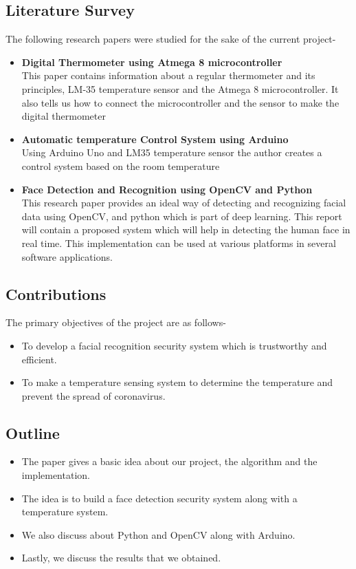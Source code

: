 \documentclass[conference]{IEEEtran}
\begin{document}
	\subsection{Literature Survey}
	The following research papers were studied for the sake of the current project-
	\begin{itemize}
		\item\textbf{Digital Thermometer using Atmega 8
			microcontroller}\cite{a} \\This paper contains information about a
		regular thermometer and its principles,
		LM-35 temperature sensor and the Atmega
		8 microcontroller. It also tells us how to
		connect the microcontroller and the sensor
		to make the digital thermometer
		\item \textbf{Automatic temperature Control System using
			Arduino}\cite{b} \\Using Arduino Uno and LM35
		temperature sensor the author creates a
		control system based on the room
		temperature
		\item \textbf{Face Detection and Recognition using OpenCV
			and Python}\cite{d} \\This research paper provides an ideal way of
		detecting and recognizing facial data
		using OpenCV, and python which is part of
		deep learning. This report will contain a
		proposed system which will help in
		detecting the human face in real time. This
		implementation can be used at various
		platforms in several software applications.
	\end{itemize}
	\subsection{Contributions}
	The primary objectives of the project are as follows-
	\begin{itemize}
		\item To develop a facial recognition security system
		which is trustworthy and efficient.
		\item To make a temperature sensing system to determine
		the temperature and prevent the spread of
		coronavirus.
	\end{itemize}
	\subsection{Outline}
	\begin{itemize}
		\item The paper gives a basic idea about our project, the
		algorithm and the implementation.
		\item The idea is to build a face detection security system
		along with a temperature system.
		\item We also discuss about Python and OpenCV along
		with Arduino.
		\item Lastly, we discuss the results that we obtained.
	\end{itemize}
	
\end{document}
